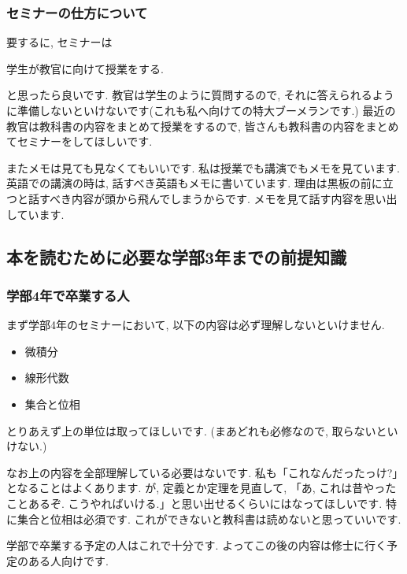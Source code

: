 \subsubsection{セミナーの仕方について}

要するに, セミナーは
\begin{tcolorbox}[mybox]
\begin{center}
学生が教官に向けて授業をする.
\end{center}
\end{tcolorbox}
と思ったら良いです.  
教官は学生のように質問するので, それに答えられるように準備しないといけないです(これも私へ向けての特大ブーメランです.)
最近の教官は教科書の内容をまとめて授業をするので, 皆さんも教科書の内容をまとめてセミナーをしてほしいです. 

またメモは見ても見なくてもいいです. 私は授業でも講演でもメモを見ています. 英語での講演の時は, 話すべき英語もメモに書いています. 
理由は黒板の前に立つと話すべき内容が頭から飛んでしまうからです. メモを見て話す内容を思い出しています. 

\subsection{本を読むために必要な学部3年までの前提知識}
\label{subsec-class}

\subsubsection{学部4年で卒業する人}
まず学部4年のセミナーにおいて, 以下の内容は必ず理解しないといけません. 
\vspace{-8pt}
\begin{itemize}[left=0pt]
  \setlength{\parskip}{0cm} %
  \setlength{\itemsep}{0cm} %
  \item 微積分
  \item 線形代数
 \item 集合と位相
\end{itemize}
とりあえず上の単位は取ってほしいです. (まあどれも必修なので, 取らないといけない.)

なお上の内容を全部理解している必要はないです.
私も「これなんだったっけ?」となることはよくあります. が, 定義とか定理を見直して, 「あ, これは昔やったことあるぞ. こうやればいける.」と思い出せるくらいにはなってほしいです. 
特に集合と位相は必須です. これができないと教科書は読めないと思っていいです. 

学部で卒業する予定の人はこれで十分です. 
よってこの後の内容は修士に行く予定のある人向けです. 

